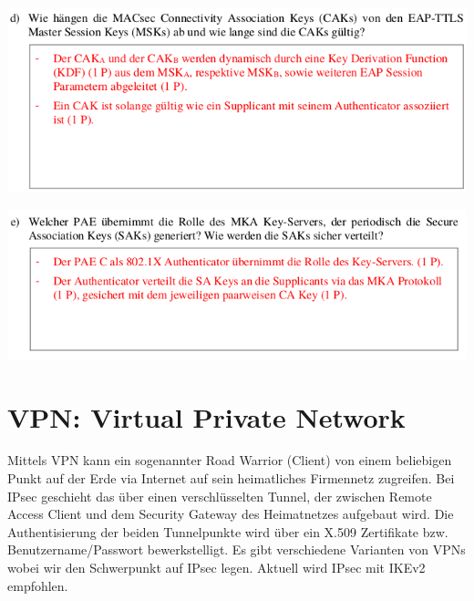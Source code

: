 \begin{minipage}[t]{1\textwidth}
    \centering
	\includegraphics[width=0.9\linewidth]{images/hs18-19_macsec_exc4.png}
\end{minipage}

\begin{minipage}[t]{1\textwidth}
    \centering
	\includegraphics[width=0.9\linewidth]{images/hs18-19_macsec_exc5.png}
\end{minipage}


\section{VPN: Virtual Private Network}
Mittels VPN kann ein sogenannter Road Warrior (Client) von einem beliebigen Punkt auf der Erde via Internet auf sein heimatliches Firmennetz zugreifen. Bei IPsec geschieht das über einen verschlüsselten Tunnel, der zwischen Remote Access Client und dem Security Gateway des Heimatnetzes aufgebaut wird. Die Authentisierung der beiden Tunnelpunkte wird über ein X.509 Zertifikate bzw. Benutzername/Passwort bewerkstelligt. Es gibt verschiedene Varianten von VPNs wobei wir den Schwerpunkt auf IPsec legen. Aktuell wird IPsec mit IKEv2 empfohlen.


